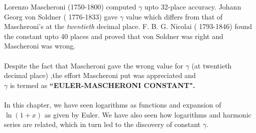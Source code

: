 \documentclass[a4paper,11pt]{article}
\begin{document}
\noindent Lorenzo 
Mascheroni (1750-1800) computed $\gamma$ upto 32-place accuracy. 
Johann Georg von Soldner ( 1776-1833) gave $\gamma$ value which differs from that of
Mascheroni's at the \textit{twentieth} decimal place. F. B. G. Nicolai ( 1793-1846) found the constant upto 40 places and proved that  von Soldner 
was right and Mascheroni was wrong.\\
\\
Despite the fact that Mascheroni gave the wrong value for $\gamma$ (at twentieth decimal place) ,the effort Mascheroni put was appreciated and \\$\gamma$ is termed as \textbf{``EULER-MASCHERONI CONSTANT".}\\
\\
In this chapter, we have seen logarithms as functions and expansion of $\ln(1+x)$ as given by Euler. We have also seen how logarithms and harmonic series are related, which in turn led to the discovery of constant $\gamma.$
\end{document}
